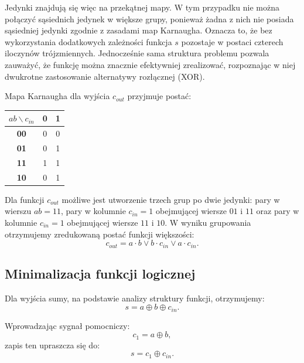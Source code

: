 \documentclass[12pt,a4paper]{article}
\begin{document}
Jedynki znajdują się więc na przekątnej mapy. W tym przypadku nie można połączyć sąsiednich jedynek w większe grupy, ponieważ żadna z nich nie posiada sąsiedniej jedynki zgodnie z zasadami map Karnaugha. Oznacza to, że bez wykorzystania dodatkowych zależności funkcja $s$ pozostaje w postaci czterech iloczynów trójzmiennych. Jednocześnie sama struktura problemu pozwala zauważyć, że funkcję można znacznie efektywniej zrealizować, rozpoznając w niej dwukrotne zastosowanie alternatywy rozłącznej (XOR).

Mapa Karnaugha dla wyjścia $c_{out}$ przyjmuje postać:

\begin{center}
\begin{tabular}{|c|c|c|}
\hline
$ab \backslash c_{in}$ & \textbf{0} & \textbf{1} \\
\hline
\textbf{00} & 0 & 0 \\
\hline
\textbf{01} & 0 & 1 \\
\hline
\textbf{11} & 1 & 1 \\
\hline
\textbf{10} & 0 & 1 \\
\hline
\end{tabular}
\end{center}

Dla funkcji $c_{out}$ możliwe jest utworzenie trzech grup po dwie jedynki: pary w wierszu $ab = 11$, pary w kolumnie $c_{in} = 1$ obejmującej wiersze $01$ i $11$ oraz pary w kolumnie $c_{in} = 1$ obejmującej wiersze $11$ i $10$. W wyniku grupowania otrzymujemy zredukowaną postać funkcji większości:
\begin{equation*}
c_{out} = a \cdot b \vee b \cdot c_{in} \vee a \cdot c_{in}.
\end{equation*}

\subsection{Minimalizacja funkcji logicznej}

Dla wyjścia sumy, na podstawie analizy struktury funkcji, otrzymujemy:
\begin{equation*}
s = a \oplus b \oplus c_{in}.
\end{equation*}

Wprowadzając sygnał pomocniczy:
\begin{equation*}
c_1 = a \oplus b,
\end{equation*}
zapis ten upraszcza się do:
\begin{equation*}
s = c_1 \oplus c_{in}.
\end{equation*}
\end{document}
